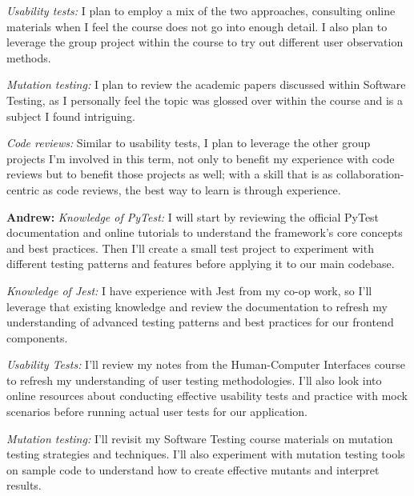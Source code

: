 \documentclass[12pt, titlepage]{article}
\begin{document}
\begin{enumerate}
  \textit{Usability tests:} I plan to employ a mix of the two approaches, consulting online materials when I feel the course does not go into enough detail. I also plan to leverage the group project within the course to try out different user observation methods.

  \textit{Mutation testing:} I plan to review the academic papers discussed within Software Testing, as I personally feel the topic was glossed over within the course and is a subject I found intriguing. 

  \textit{Code reviews:} Similar to usability tests, I plan to leverage the other group projects I'm involved in this term, not only to benefit my experience with code reviews but to benefit those projects as well; with a skill that is as collaboration-centric as code reviews, the best way to learn is through experience.
  
  \textbf{Andrew: }
  \textit{Knowledge of PyTest:} I will start by reviewing the official PyTest documentation and online tutorials to understand the framework's core concepts and best practices. Then I'll create a small test project to experiment with different testing patterns and features before applying it to our main codebase.
  
  \textit{Knowledge of Jest:} I have experience with Jest from my co-op work, so I'll leverage that existing knowledge and review the documentation to refresh my understanding of advanced testing patterns and best practices for our frontend components.
  
  \textit{Usability Tests:} I'll review my notes from the Human-Computer Interfaces course to refresh my understanding of user testing methodologies. I'll also look into online resources about conducting effective usability tests and practice with mock scenarios before running actual user tests for our application.
  
  \textit{Mutation testing:} I'll revisit my Software Testing course materials on mutation testing strategies and techniques. I'll also experiment with mutation testing tools on sample code to understand how to create effective mutants and interpret results.
  

\end{enumerate}
\end{document}
